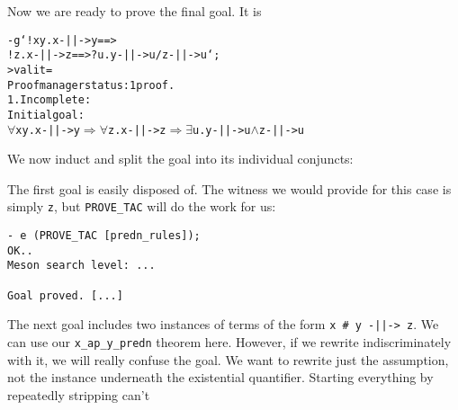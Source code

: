 \noindent Now we are ready to prove the final goal.  It is
\begin{session}
\begin{alltt}
- g `!x y. x -||-> y ==>
           !z. x -||-> z ==> ?u. y -||-> u /\bs z -||-> u`;
> val it =
    Proof manager status: 1 proof.
    1. Incomplete:
         Initial goal:
         \(\forall\)x y. x -||-> y \(\Rightarrow\) \(\forall\)z. x -||-> z \(\Rightarrow\) \(\exists\)u. y -||-> u \(\land\) z -||-> u
\end{alltt}
\end{session}
We now induct and split the goal into its individual conjuncts:
The first goal is easily disposed of.  The witness we would provide
for this case is simply \texttt{z}, but \texttt{PROVE\_TAC} will do
the work for us:
\begin{session}
\begin{verbatim}
- e (PROVE_TAC [predn_rules]);
OK..
Meson search level: ...

Goal proved. [...]
\end{verbatim}
\end{session}
    The next goal includes two instances of terms of the form
    \verb!x # y -||-> z!.  We can use our \verb!x_ap_y_predn!
    theorem here.  However, if we rewrite indiscriminately with it, we
    will really confuse the goal.  We want to rewrite just the
    assumption, not the instance underneath the existential
    quantifier.  Starting everything by repeatedly stripping can't

